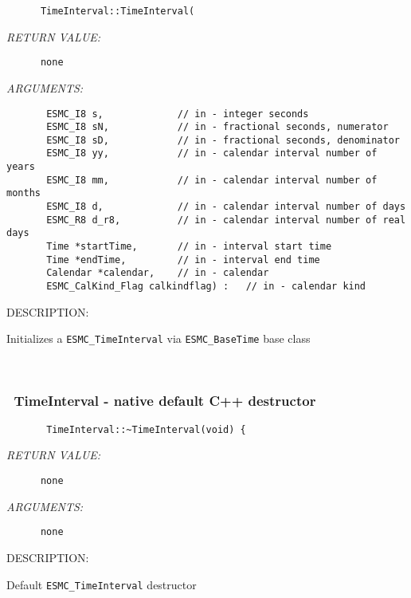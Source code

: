   
\begin{verbatim}      TimeInterval::TimeInterval(\end{verbatim}{\em RETURN VALUE:}
\begin{verbatim}      none\end{verbatim}{\em ARGUMENTS:}
\begin{verbatim}       ESMC_I8 s,             // in - integer seconds
       ESMC_I8 sN,            // in - fractional seconds, numerator
       ESMC_I8 sD,            // in - fractional seconds, denominator
       ESMC_I8 yy,            // in - calendar interval number of years
       ESMC_I8 mm,            // in - calendar interval number of months
       ESMC_I8 d,             // in - calendar interval number of days
       ESMC_R8 d_r8,          // in - calendar interval number of real days
       Time *startTime,       // in - interval start time
       Time *endTime,         // in - interval end time
       Calendar *calendar,    // in - calendar
       ESMC_CalKind_Flag calkindflag) :   // in - calendar kind\end{verbatim}
{\sf DESCRIPTION:\\ }


        Initializes a {\tt ESMC\_TimeInterval} via {\tt ESMC\_BaseTime}
        base class
   
 
\mbox{}\hrulefill\ 
 
\subsubsection [~TimeInterval] {~TimeInterval - native default C++ destructor}


  
\begin{verbatim}       TimeInterval::~TimeInterval(void) {\end{verbatim}{\em RETURN VALUE:}
\begin{verbatim}      none\end{verbatim}{\em ARGUMENTS:}
\begin{verbatim}      none\end{verbatim}
{\sf DESCRIPTION:\\ }


        Default {\tt ESMC\_TimeInterval} destructor
   
 
